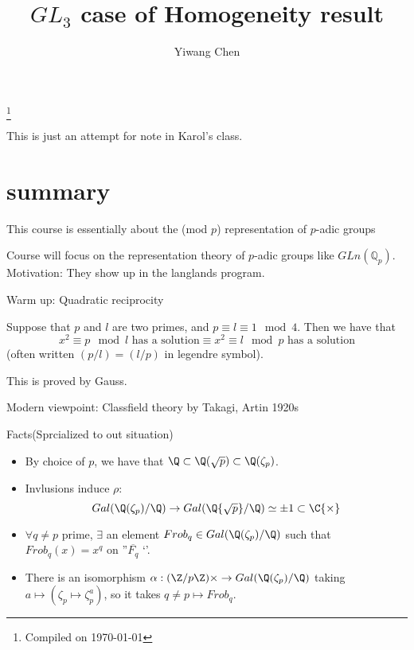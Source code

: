 \documentclass{amsart}
\theoremstyle{definition}
\theoremstyle{remark}
\numberwithin{equation}{section}
\newcommand{\mbb}[1]{\mathbb{#1}}
\newcommand{\QQ}{\mbb{Q}}
\begin{document}
\title{$GL_3$ case of Homogeneity result}
\author{Yiwang Chen}
\thanks{Compiled on \today}


\maketitle

This is just an attempt for note in Karol's class.

\section{summary}

This course is essentially about the (mod $p$) representation of $p$-adic groups

Course will focus on the representation theory of $p$-adic groups like $GL{n(\QQ_p)}$.
\\Motivation: They show up in the langlands program.

Warm up: Quadratic reciprocity

Suppose that $p$ and $l$ are two primes, and $p \equiv l \equiv 1 \mod 4$. Then we have that \[x^2 \equiv p \mod l \text{ has a solution} \equiv x^2 \equiv l \mod p \text{ has a solution}\]
(often written $(p/l)=(l/p)$ in legendre symbol).

This is proved by Gauss.

Modern viewpoint: Classfield theory by Takagi, Artin 1920s

Facts(Sprcialized to out situation)
\begin{itemize}
  \item By choice of $p$, we have that $\Q \subset \Q(\sqrt{p})\subset \Q(\zeta_p)$.
  \item Invlusions induce $\rho$:
  \[Gal(\Q(\zeta_p)/\Q) \to Gal(\Q{\sqrt{p}}/\Q)\simeq {\pm 1}\subset \C{\times}\]
  \item $\forall q \neq p$ prime, $\exists$ an element $Frob_{q} \in Gal(\Q(\zeta_p)/\Q)$ such that $Frob_{q}(x)=x^{q}$ on ''$\overline{F_q}$ `'.
  \item There is an isomorphism $\alpha:(\Z/p\Z){\times} \to Gal(\Q(\zeta_p)/\Q)$ taking $a \mapsto (\zeta_p \mapsto \zeta_p^a)$, so it takes $q \neq p \mapsto Frob_{q}$.
\end{itemize}
\end{document}
